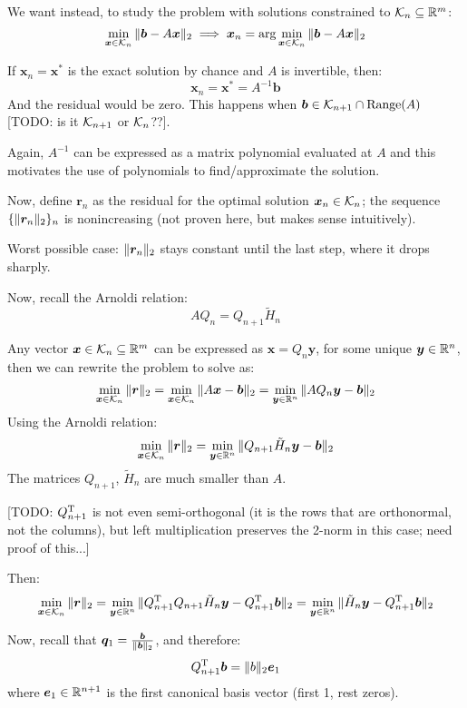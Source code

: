 \documentclass[
  12pt,
  paper=a4,
]{scrartcl} %
\begin{document}
We want instead, to study the problem with solutions constrained to $\mathcal{K}_n\subseteq \mathbb R^{m}$:
\[
    \min_{\bm x\in\mathcal{K}_n}\|
        \bm b - A\bm x
    \|_2
    \implies
    \bm x_n = \arg\min_{\bm x\in\mathcal{K}_n}\|
        \bm b - A\bm x
    \|_2
\]

If $\bm x_n = \bm x^*$ is the exact solution by chance and $A$ is invertible, then:
\[
    \bm x_n = \bm x^* =A^{-1}\bm b
\]
And the residual would be zero. This happens when $\bm b\in \mathcal{K}_{n+1} \cap \operatorname{Range}(A)$ [TODO: is it $\mathcal{K}_{n+1}$ or $\mathcal{K}_{n}$??].

Again, $A^{-1}$ can be expressed as a matrix polynomial evaluated at $A$ and this motivates the use of polynomials to find/approximate the solution.

Now, define $\bm r_n$ as the residual for the optimal solution $\bm x_n\in\mathcal{K}_n$; the sequence $\{\|\bm r_n\|_2\}_n$ is nonincreasing (not proven here, but makes sense intuitively).

Worst possible case: $\|\bm r_n\|_2$ stays constant until the last step, where it drops sharply.

Now, recall the Arnoldi relation:
\[
    AQ_n = Q_{n+1} \tilde H_n
\]

Any vector $\bm x\in \mathcal{K}_n\subseteq\mathbb R^m$ can be expressed as $\bm x = Q_n\bm y$, for some unique $\bm y\in \mathbb R^n$, then we can rewrite the problem to solve as:
\[
    \min_{\bm x\in\mathcal{K}_n}\|
        \bm r
    \|_2
    =
    \min_{\bm x\in\mathcal{K}_n}\|
        {A\bm x - \bm b}
    \|_2
    =
    \min_{\bm y\in\mathbb R^{n}}\|
        {AQ_n\bm y - \bm b}
    \|_2
\]
Using the Arnoldi relation:
\[
    \min_{\bm x\in\mathcal{K}_n}\|
        \bm r
    \|_2
    =
    \min_{\bm y\in\mathbb R^{n}}\|
        {Q_{n+1}\tilde H_n\bm y - \bm b}
    \|_2
\]
The matrices $Q_{n+1}$, $\tilde H_n$ are much smaller than $A$.

[TODO: $Q_{n+1}^{\mathrm{T}}$ is not even semi-orthogonal (it is the rows that are orthonormal, not the columns), but left multiplication preserves the 2-norm in this case; need proof of this...]

Then:
\[
    \min_{\bm x\in\mathcal{K}_n}\|
        \bm r
    \|_2
    =
    \min_{\bm y\in\mathbb R^{n}}\|
        Q_{n+1}^{\mathrm{T}} Q_{n+1}\tilde H_n\bm y - Q_{n+1}^{\mathrm{T}}\bm b
    \|_2
    =
    \min_{\bm y\in\mathbb R^{n}}\|
        \tilde H_{n} \bm y - Q_{n+1}^{\mathrm{T}}\bm b
    \|_2
\]

Now, recall that $\bm q_1 =\frac{\bm b}{\|\bm b\|_2}$, and therefore:
\[Q_{n+1}^{\mathrm{T}}\bm b = \|b\|_2 \bm e_1 \]
where $\bm e_1 \in \mathbb R^{n+1}$ is the first canonical basis vector (first 1, rest zeros).
\end{document}
